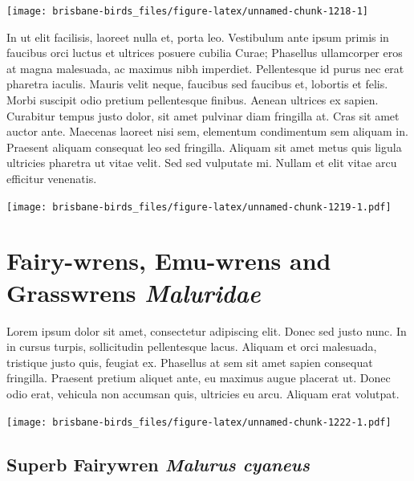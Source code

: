 \documentclass[]{book}
\let\origfigure\figure
\let\endorigfigure\endfigure
\renewenvironment{figure}[1][2] {
  \expandafter\origfigure\expandafter[H]
} {
  \endorigfigure
}
\begin{document}
\begin{figure}
\texttt{[image: brisbane-birds\_files/figure-latex/unnamed-chunk-1218-1]} \caption{insert figure caption}\label{fig:unnamed-chunk-1218}
\end{figure}

In ut elit facilisis, laoreet nulla et, porta leo. Vestibulum ante ipsum
primis in faucibus orci luctus et ultrices posuere cubilia Curae;
Phasellus ullamcorper eros at magna malesuada, ac maximus nibh
imperdiet. Pellentesque id purus nec erat pharetra iaculis. Mauris velit
neque, faucibus sed faucibus et, lobortis et felis. Morbi suscipit odio
pretium pellentesque finibus. Aenean ultrices ex sapien. Curabitur
tempus justo dolor, sit amet pulvinar diam fringilla at. Cras sit amet
auctor ante. Maecenas laoreet nisi sem, elementum condimentum sem
aliquam in. Praesent aliquam consequat leo sed fringilla. Aliquam sit
amet metus quis ligula ultricies pharetra ut vitae velit. Sed sed
vulputate mi. Nullam et elit vitae arcu efficitur venenatis.

\begin{figure}
\centering
\texttt{[image: brisbane-birds\_files/figure-latex/unnamed-chunk-1219-1.pdf]}
\caption{\label{fig:unnamed-chunk-1219}insert figure caption}
\end{figure}

\chapter{\texorpdfstring{Fairy-wrens, Emu-wrens and Grasswrens
\emph{Maluridae}}{Fairy-wrens, Emu-wrens and Grasswrens Maluridae}}\label{fairy-wrens-emu-wrens-and-grasswrens-maluridae}

Lorem ipsum dolor sit amet, consectetur adipiscing elit. Donec sed justo
nunc. In in cursus turpis, sollicitudin pellentesque lacus. Aliquam et
orci malesuada, tristique justo quis, feugiat ex. Phasellus at sem sit
amet sapien consequat fringilla. Praesent pretium aliquet ante, eu
maximus augue placerat ut. Donec odio erat, vehicula non accumsan quis,
ultricies eu arcu. Aliquam erat volutpat.

\texttt{[image: brisbane-birds\_files/figure-latex/unnamed-chunk-1222-1.pdf]}

\section{\texorpdfstring{Superb Fairywren \emph{Malurus
cyaneus}}{Superb Fairywren Malurus cyaneus}}\label{superb-fairywren-malurus-cyaneus}
\end{document}
